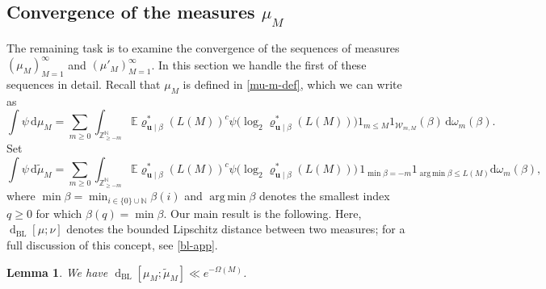 \documentclass[11pt,reqno]{amsart}
\DeclareMathOperator*{\argmin}{arg\,min}
\numberwithin{equation}{section}
\newtheorem{lemma}[theorem]{Lemma}
\theoremstyle{definition}
\theoremstyle{remark}
\newcommand{\mb}{\mathbb}
\newcommand{\mbf}{\mathbf}
\newcommand{\dist}[2]{{\operatorname{d}_{\operatorname{BL}}[#1;#2]}}
\renewcommand{\le}{\leqslant}
\renewcommand{\ge}{\geqslant}
\newcommand\Z{\mathbb{Z}}
\newcommand\N{\mathbb{N}}
\begin{document}
\subsection{Convergence of the measures $\mu_M$} 

The remaining task is to examine the convergence of the sequences of measures $(\mu_M)_{M = 1}^{\infty}$ and $(\mu'_M)_{M = 1}^{\infty}$. In this section we handle the first of these sequences in detail. Recall that $\mu_M$ is defined in \cref{mu-m-def}, which we can write as 
\begin{equation*}
\int \psi \, \mathrm{d}\mu_{M} =  \sum_{m \ge 0}\int_{\Z^\N_{\ge -m}} \mb{E} \varrho^*_{\mbf{u} \mid \beta}(L(M))^c \psi\big(\log_2 \varrho^*_{\mbf{u} \mid \beta}(L(M))\big)1_{m \le M} 1_{\mathscr{W}_{m,M}}(\beta)\, \mathrm{d}\omega_m(\beta).
\end{equation*}
Set
\begin{equation}\label{mu-m-ti} 
\int \psi \, \mathrm{d}\tilde\mu_{M} =  \sum_{m \ge 0}\int_{\Z^\N_{\ge -m}} \mb{E} \varrho^*_{\mbf{u} \mid \beta}(L(M))^c \psi\big(\log_2 \varrho^*_{\mbf{u} \mid \beta}(L(M))\big)\, 1_{\min \beta = -m} 1_{\argmin \beta \le L(M)}\mathrm{d}\omega_m(\beta),
\end{equation} where $\min \beta = \min_{i \in \{0\} \cup \N} \beta(i)$ and $\argmin\beta$ denotes the smallest index $q \ge 0$ for which $\beta(q) = \min \beta$. Our main result is the following. Here, $\dist{\mu}{\nu}$ denotes the bounded Lipschitz distance between two measures; for a full discussion of this concept, see \cref{bl-app}.

\begin{lemma}\label{mu-mutilde-compar}
We have $\dist{\mu_M}{\tilde\mu_M} \ll e^{-\Omega(M)}$.
\end{lemma}
\end{document}

